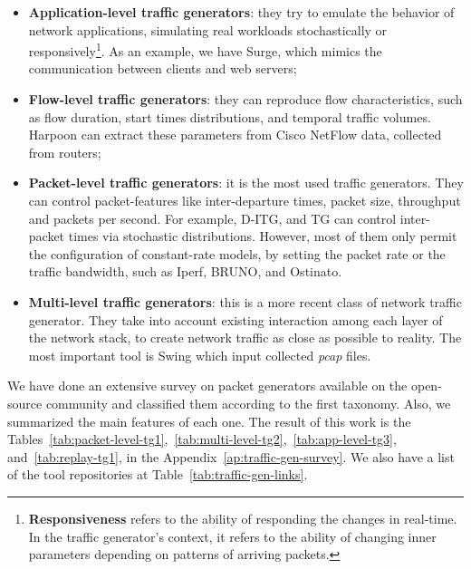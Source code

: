\begin{itemize}

\item \textbf{Application-level traffic generators}: they try to emulate the behavior of network applications, simulating real workloads stochastically or responsively\footnote{\textbf{Responsiveness} refers to the ability of responding the changes in real-time. In the traffic generator's context, it refers to the ability of changing inner parameters depending on patterns of arriving packets.}. As an example, we have Surge, which mimics the communication between clients and web
servers;

\item \textbf{Flow-level traffic generators}: they can reproduce flow characteristics, such as flow duration, start times distributions, and temporal traffic volumes. Harpoon can extract these parameters from Cisco NetFlow data, collected from routers;

\item \textbf{Packet-level traffic generators}: it is the most used traffic generators. They can control packet-features like inter-departure times, packet size, throughput and packets per second. For example, D-ITG\cite{ditg-paper}, and TG\cite{web-tg} can control inter-packet times via stochastic distributions. However, most of them only permit the configuration of constant-rate models, by setting the packet rate or the traffic bandwidth, such as Iperf\cite{web-iperf}, BRUNO\cite{bruno-paper}, and Ostinato\cite{web-ostinato}.

\item \textbf{Multi-level traffic generators}: this is a more recent class of network traffic generator. They take into account existing interaction among each layer of the network stack, to create network traffic as close as possible to reality. The most important tool is Swing\cite{swing-paper} which input collected \textit{pcap} files. 

\end{itemize}


We have done an extensive survey on packet generators available on the open-source community and classified them according to the first taxonomy. Also, we summarized the main features of each one. The result of this work is the Tables~\ref{tab:packet-level-tg1},~\ref{tab:multi-level-tg2},~\ref{tab:app-level-tg3}, and~\ref{tab:replay-tg1}, in the Appendix~\ref{ap:traffic-gen-survey}. We also have a list of the tool repositories at Table~\ref{tab:traffic-gen-links}.



